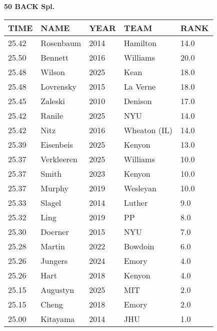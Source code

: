 \begin{center}
\begin{minipage}[t]{0.7\textwidth}
\centering
\textbf{50 BACK Spl.}\\[0.05cm]
\begin{tabular}{@{}p{1.8cm}p{2.8cm}p{1.2cm}p{1.4cm}p{0.8cm}@{}}
\hline
\textbf{TIME} & \textbf{NAME} & \textbf{YEAR} & \textbf{TEAM} & \textbf{RANK} \\
\hline
25.42 & Rosenbaum & 2014 & Hamilton & 14.0 \\
25.50 & Bennett & 2016 & Williams & 20.0 \\
25.48 & Wilson & 2025 & Kean & 18.0 \\
25.48 & Lovrensky & 2015 & La Verne & 18.0 \\
25.45 & Zaleski & 2010 & Denison & 17.0 \\
25.42 & Ranile & 2025 & NYU & 14.0 \\
25.42 & Nitz & 2016 & Wheaton (IL) & 14.0 \\
25.39 & Eisenbeis & 2025 & Kenyon & 13.0 \\
25.37 & Verkleeren & 2025 & Williams & 10.0 \\
25.37 & Smith & 2023 & Kenyon & 10.0 \\
25.37 & Murphy & 2019 & Wesleyan & 10.0 \\
25.33 & Slagel & 2014 & Luther & 9.0 \\
25.32 & Ling & 2019 & PP & 8.0 \\
25.30 & Doerner & 2015 & NYU & 7.0 \\
25.28 & Martin & 2022 & Bowdoin & 6.0 \\
25.26 & Jungers & 2024 & Emory & 4.0 \\
25.26 & Hart & 2018 & Kenyon & 4.0 \\
25.15 & Augustyn & 2025 & MIT & 2.0 \\
25.15 & Cheng & 2018 & Emory & 2.0 \\
25.00 & Kitayama & 2014 & JHU & 1.0 \\
\hline
\end{tabular}
\end{minipage}
\end{center}

\vspace{0.4cm}

